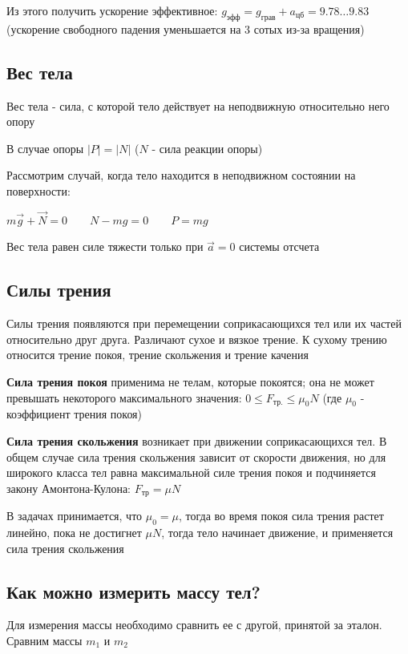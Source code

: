 \documentclass[12pt]{article}
\begin{document}
    Из этого получить ускорение эффективное: $g_\text{эфф} = g_\text{грав} + a_\text{цб} = 9.78\dots9.83$ (ускорение свободного падения уменьшается на 3 сотых из-за вращения)

    \subsection{Вес тела}

    \Def Вес тела - сила, с которой тело действует на неподвижную относительно него опору

    В случае опоры $|P| = |N|$ ($N$ - сила реакции опоры)

    Рассмотрим случай, когда тело находится в неподвижном состоянии на поверхности:

    $m\vec{g} + \vec{N} = 0 \quad\quad N - mg = 0 \quad\quad P = mg$

    Вес тела равен силе тяжести только при $\vec{a} = 0$ системы отсчета

    \subsection{Силы трения}

    Силы трения появляются при перемещении соприкасающихся тел или их частей относительно друг друга.
    Различают сухое и вязкое трение. К сухому трению относится трение покоя, трение скольжения и трение качения

    \textbf{Сила трения покоя} применима не телам, которые покоятся; она не может превышать некоторого максимального значения: $0 \leq F_\text{тр.} \leq \mu_0 N$ (где $\mu_0$ - коэффициент трения покоя)

    \textbf{Сила трения скольжения} возникает при движении соприкасающихся тел. В общем случае сила трения скольжения зависит
    от скорости движения, но для широкого класса тел равна максимальной силе трения покоя и подчиняется закону Амонтона-Кулона: $F_\text{тр} = \mu N$

    В задачах принимается, что $\mu_0 = \mu$, тогда во время покоя сила трения растет линейно, пока не достигнет $\mu N$, тогда тело начинает движение, и применяется сила трения скольжения

    \subsection{Как можно измерить массу тел?}

    Для измерения массы необходимо сравнить ее с другой, принятой за эталон. Сравним массы $m_1$ и $m_2$
\end{document}
